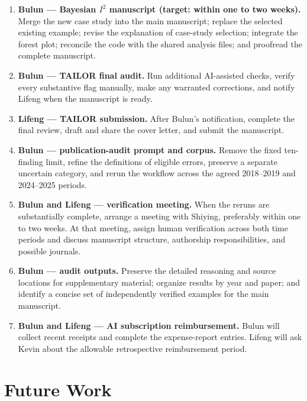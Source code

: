 \documentclass[11pt]{article}
\begin{document}
\begin{enumerate}
    \item \textbf{Bulun --- Bayesian $I^2$ manuscript (target: within one to two weeks).} Merge the new case study into the main manuscript; replace the selected existing example; revise the explanation of case-study selection; integrate the forest plot; reconcile the code with the shared analysis files; and proofread the complete manuscript.

    \item \textbf{Bulun --- TAILOR final audit.} Run additional AI-assisted checks, verify every substantive flag manually, make any warranted corrections, and notify Lifeng when the manuscript is ready.

    \item \textbf{Lifeng --- TAILOR submission.} After Bulun's notification, complete the final review, draft and share the cover letter, and submit the manuscript.

    \item \textbf{Bulun --- publication-audit prompt and corpus.} Remove the fixed ten-finding limit, refine the definitions of eligible errors, preserve a separate uncertain category, and rerun the workflow across the agreed 2018--2019 and 2024--2025 periods.

    \item \textbf{Bulun and Lifeng --- verification meeting.} When the reruns are substantially complete, arrange a meeting with Shiying, preferably within one to two weeks. At that meeting, assign human verification across both time periods and discuss manuscript structure, authorship responsibilities, and possible journals.

    \item \textbf{Bulun --- audit outputs.} Preserve the detailed reasoning and source locations for supplementary material; organize results by year and paper; and identify a concise set of independently verified examples for the main manuscript.

    \item \textbf{Bulun and Lifeng --- AI subscription reimbursement.} Bulun will collect recent receipts and complete the expense-report entries. Lifeng will ask Kevin about the allowable retrospective reimbursement period.
\end{enumerate}

\section*{Future Work}
\end{document}
